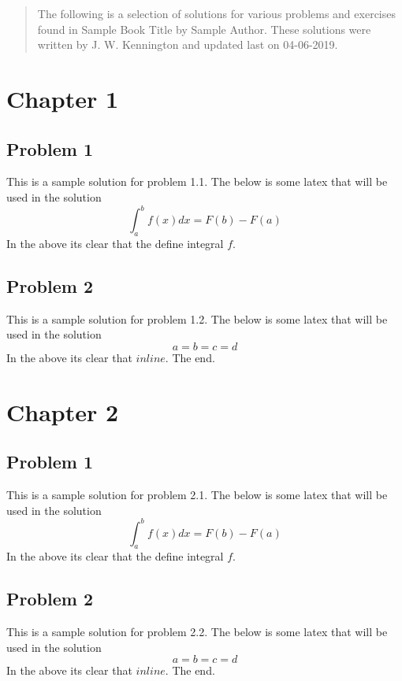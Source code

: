 \documentclass[12pt]{article}
\begin{document}
\maketitle

\begin{abstract}

        The following is a selection of solutions for various problems and exercises found
        in Sample Book Title by Sample Author. These solutions were written by J. W. Kennington and updated
        last on 04-06-2019.
        
\end{abstract}

\section{ Chapter 1 }
\subsection{ Problem 1 }
This is a sample solution for problem 1.1. The below is some latex that
will be used in the solution \[\int_{a}^b f(x) dx = F(b) - F(a)\] In the
above its clear that the define integral \(f\).


\subsection{ Problem 2 }
This is a sample solution for problem 1.2. The below is some latex that
will be used in the solution \[a = b = c = d\] In the above its clear
that \(inline\). The end.


\section{ Chapter 2 }
\subsection{ Problem 1 }
This is a sample solution for problem 2.1. The below is some latex that
will be used in the solution \[\int_{a}^b f(x) dx = F(b) - F(a)\] In the
above its clear that the define integral \(f\).


\subsection{ Problem 2 }
This is a sample solution for problem 2.2. The below is some latex that
will be used in the solution \[a = b = c = d\] In the above its clear
that \(inline\). The end.


\nocite{*}


\end{document}
